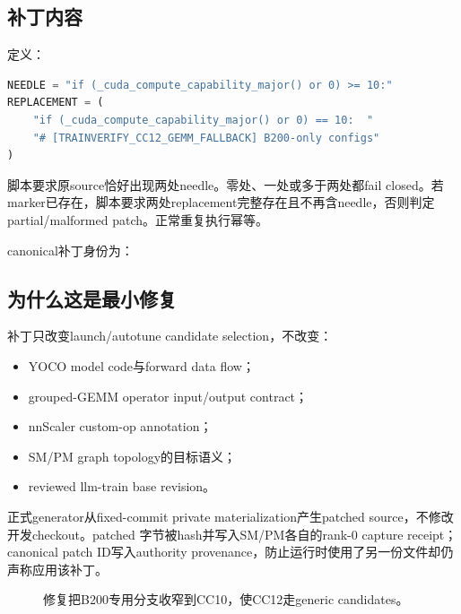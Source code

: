 \documentclass[10.5pt,a4paper]{ctexart}
\begin{document}
\subsection{补丁内容}

定义：
\begin{lstlisting}[language=Python]
NEEDLE = "if (_cuda_compute_capability_major() or 0) >= 10:"
REPLACEMENT = (
    "if (_cuda_compute_capability_major() or 0) == 10:  "
    "# [TRAINVERIFY_CC12_GEMM_FALLBACK] B200-only configs"
)
\end{lstlisting}

脚本要求原source恰好出现两处needle。零处、一处或多于两处都fail closed。若marker已存在，脚本要求两处replacement完整存在且不再含needle，否则判定partial/malformed patch。正常重复执行幂等。

canonical补丁身份为：
\begin{quote}
\end{quote}

\subsection{为什么这是最小修复}

补丁只改变launch/autotune candidate selection，不改变：
\begin{itemize}
  \item YOCO model code与forward data flow；
  \item grouped-GEMM operator input/output contract；
  \item nnScaler custom-op annotation；
  \item SM/PM graph topology的目标语义；
  \item reviewed llm-train base revision。
\end{itemize}

正式generator从fixed-commit private materialization产生patched source，不修改开发checkout。patched 字节被hash并写入SM/PM各自的rank-0 capture receipt；canonical patch ID写入authority provenance，防止运行时使用了另一份文件却仍声称应用该补丁。

\begin{figure}[h]
\centering
{}
\caption{修复把B200专用分支收窄到CC10，使CC12走generic candidates。}
\end{figure}
\end{document}
